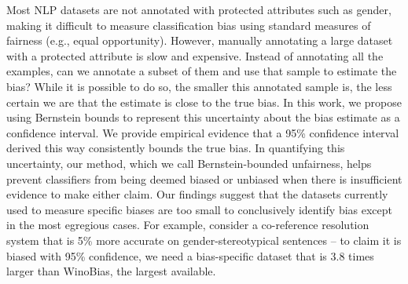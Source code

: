 Most NLP datasets are not annotated with protected attributes such as gender, making it difficult to measure classification bias using standard measures of fairness (e.g., equal opportunity). However, manually annotating a large dataset with a protected attribute is slow and expensive. Instead of annotating all the examples, can we annotate a subset of them and use that sample to estimate the bias? While it is possible to do so, the smaller this annotated sample is, the less certain we are that the estimate is close to the true bias. In this work, we propose using Bernstein bounds to represent this uncertainty about the bias estimate as a confidence interval. We provide empirical evidence that a 95\% confidence interval derived this way consistently bounds the true bias. In quantifying this uncertainty, our method, which we call Bernstein-bounded unfairness, helps prevent classifiers from being deemed biased or unbiased when there is insufficient evidence to make either claim. Our findings suggest that the datasets currently used to measure specific biases are too small to conclusively identify bias except in the most egregious cases. For example, consider a co-reference resolution system that is 5\% more accurate on gender-stereotypical sentences -- to claim it is biased with 95\% confidence, we need a bias-specific dataset that is 3.8 times larger than WinoBias, the largest available.
